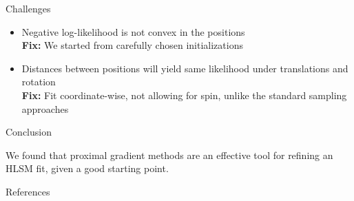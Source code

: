 \documentclass[final]{beamer}
\newlength{\onecolwid}
\begin{document}
\begin{frame}[t]
\begin{columns}[t]
\begin{column}{\onecolwid}
  \begin{block}{Challenges}

    \begin{itemize}
    \item Negative log-likelihood is not convex in the positions\\
      \textbf{Fix:} We started from carefully chosen initializations
    \item Distances between positions will yield same likelihood under
      translations and rotation\\
      \textbf{Fix:} Fit coordinate-wise, not allowing for spin, unlike the
      standard sampling approaches
    \end{itemize}

\end{block}


%
%



\begin{block}{Conclusion}

We found that proximal gradient methods are an effective tool for
refining an HLSM fit, given a good starting point.


\end{block}



 \begin{block}{References}

 \small{
 \vspace{0.75in}}


\end{block}
\end{column}
\end{columns}
\end{frame}
\end{document}

